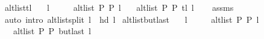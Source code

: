 \begin{isabellebody}
\isamarkupfalse%
%
\endisatagproof
{\isafoldproof}%
%
\isadelimproof
\isanewline
%
\endisadelimproof
%
\isadeliminvisible
\isanewline
%
\endisadeliminvisible
%
\isataginvisible
{}\isamarkupfalse%
\ alt{\isacharunderscore}{\kern0pt}list{\isacharunderscore}{\kern0pt}tl{\isacharcolon}{\kern0pt}\isanewline
\ \ \ {\isachardoublequoteopen}l\ {\isasymnoteq}\ {\isacharbrackleft}{\kern0pt}{\isacharbrackright}{\kern0pt}{\isachardoublequoteclose}\isanewline
\ \ \ {\isachardoublequoteopen}alt{\isacharunderscore}{\kern0pt}list\ P{}\ P{}\ l{\isachardoublequoteclose}\isanewline
\ \ \ {\isachardoublequoteopen}alt{\isacharunderscore}{\kern0pt}list\ P{}\ P{}\ {\isacharparenleft}{\kern0pt}tl\ l{\isacharparenright}{\kern0pt}{\isachardoublequoteclose}%
\endisataginvisible
{\isafoldinvisible}%
%
\isadeliminvisible
\isanewline
%
\endisadeliminvisible
%
\isadelimproof
\ \ %
\endisadelimproof
%
\isatagproof
{}\isamarkupfalse%
\ assms\isanewline
\ \ \isamarkupfalse%
\ {\isacharparenleft}{\kern0pt}auto\ intro{\isacharcolon}{\kern0pt}\ alt{\isacharunderscore}{\kern0pt}list{\isacharunderscore}{\kern0pt}split{\isacharunderscore}{\kern0pt}{}{\isacharbrackleft}{\kern0pt}\ {\isacharquery}{\kern0pt}l{}{\isachardot}{\kern0pt}{}\ {\isacharequal}{\kern0pt}\ {\isachardoublequoteopen}{\isacharbrackleft}{\kern0pt}hd\ l{\isacharbrackright}{\kern0pt}{\isachardoublequoteclose}{\isacharbrackright}{\kern0pt}{\isacharparenright}{\kern0pt}%
\endisatagproof
{\isafoldproof}%
%
\isadelimproof
\isanewline
%
\endisadelimproof
%
\isadeliminvisible
\isanewline
%
\endisadeliminvisible
%
\isataginvisible
{}\isamarkupfalse%
\ alt{\isacharunderscore}{\kern0pt}list{\isacharunderscore}{\kern0pt}butlast{\isacharcolon}{\kern0pt}\isanewline
\ \ \ {\isachardoublequoteopen}l\ {\isasymnoteq}\ {\isacharbrackleft}{\kern0pt}{\isacharbrackright}{\kern0pt}{\isachardoublequoteclose}\isanewline
\ \ \ {\isachardoublequoteopen}alt{\isacharunderscore}{\kern0pt}list\ P{}\ P{}\ l{\isachardoublequoteclose}\isanewline
\ \ \ {\isachardoublequoteopen}alt{\isacharunderscore}{\kern0pt}list\ P{}\ P{}\ {\isacharparenleft}{\kern0pt}butlast\ l{\isacharparenright}{\kern0pt}{\isachardoublequoteclose}%
\endisataginvisible
{\isafoldinvisible}%
%
\isadeliminvisible
\isanewline
%
\endisadeliminvisible
%
\isadelimproof

\end{isabellebody}
